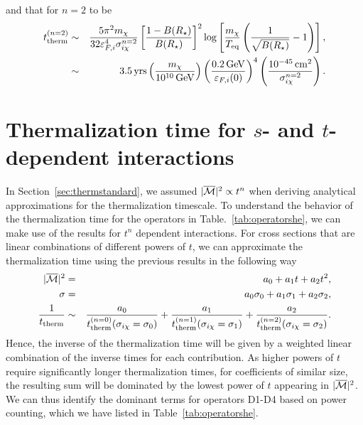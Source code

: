 and that for $n=2$ to be
\begin{eqnarray}
    t_{\rm therm}^{(n=2)} &\sim& \frac{5 \pi^2 m_\chi}{ 32 \varepsilon_{F,i}^4\sigma_{i\chi}^{n=2}} \left[\frac{1-B(R_\star)}{B(R_\star)}\right]^2 \log\left[\frac{m_\chi}{T_{\rm eq}}\left(\frac{1}{\sqrt{B(R_\star)}}-1\right)\right],\\
    &\sim& 3.5 {\rm \,yrs} \left( \frac{m_\chi}{10^{10} {\rm \,GeV}}\right) \left(\frac{0.2{\rm \,GeV}}{\varepsilon_{F,i}(0)}\right)^{4}\left(\frac{10^{-45}{\rm \,cm}^2}{\sigma_{i\chi}^{n=2}}\right). 
\end{eqnarray}







\section{Thermalization time for $s$- and $t$-dependent interactions}
\label{sec:sdeptherm}


In Section~\ref{sec:thermstandard}, we assumed $|\overline{\mathcal M}|^2\propto t^n$ when deriving analytical approximations for the thermalization timescale. To understand the behavior of the thermalization time for the operators in Table.~\ref{tab:operatorshe}, we can make use of the results for $t^n$ dependent interactions. For cross sections that are linear combinations of different powers of $t$, we can approximate the thermalization time using the previous results in the following way
\begin{eqnarray}
|\overline{\mathcal M}|^2 &=& a_0 + a_1 t + a_2 t^2,\\
\sigma &=& a_0\sigma_0 + a_1 \sigma_1 + a_2 \sigma_2,\\
\frac{1}{t_{\rm therm}} &\sim& \frac{a_0}{ t_{\rm therm}^{(n=0)}(\sigma_{i\chi}=\sigma_0)} + \frac{a_1} {t_{\rm therm}^{(n=1)}(\sigma_{i\chi}=\sigma_1)} 
 + \frac{a_2}{  t_{\rm therm}^{(n=2)}(\sigma_{i\chi}=\sigma_2)}. 
\label{eq:ttherm_weighted}
\end{eqnarray}
Hence, the inverse of the thermalization time will be given by a weighted linear combination of the inverse times for each contribution. As higher powers of $t$ require significantly longer thermalization times, for coefficients of similar size, the resulting sum will be dominated by the lowest power of $t$ appearing in  $|\overline{\mathcal M}|^2$.  We can thus identify the dominant terms for operators D1-D4  based on power counting, which we have listed in Table~\ref{tab:operatorshe}.

